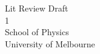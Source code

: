\documentclass[12pt]{report}
\begin{document}
\thispagestyle{empty}
\begin{center}
\vspace{1cm}
\Huge{}\\
\vspace{2cm}
\Large{}\\
\vspace{2cm} %
\large{
Lit Review Draft\\
1}\\
\vspace{1cm}
\Large{School of Physics}\\
\large{University of Melbourne}\\
\vspace{.5cm}
\vspace{1cm}
\Large{}\\
\vspace{1.cm}
\normalsize
\\
\end{center}

\tableofcontents

\newpage

\vspace*{\fill}
\end{document}
